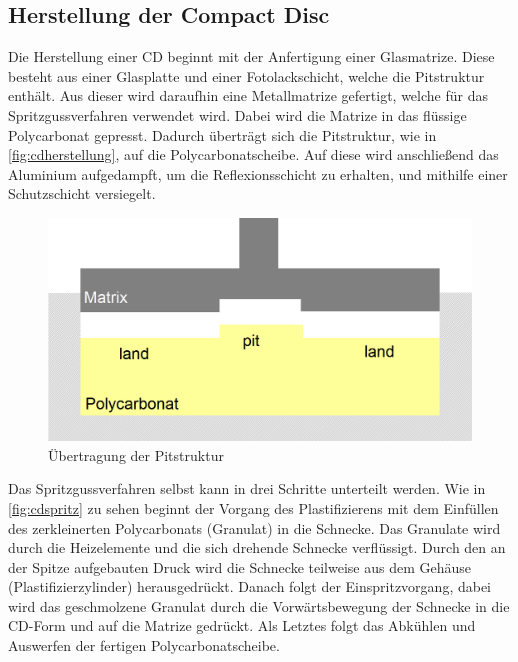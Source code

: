 \subsection{Herstellung der Compact Disc}
\label{subsec:cdherstellung}

Die Herstellung einer CD beginnt mit der Anfertigung einer Glasmatrize. Diese
besteht aus einer Glasplatte und einer Fotolackschicht, welche die Pitstruktur
enthält. Aus dieser wird daraufhin eine Metallmatrize gefertigt, welche für das
Spritzgussverfahren verwendet wird. Dabei wird die Matrize in das flüssige
Polycarbonat gepresst. Dadurch überträgt sich die Pitstruktur, wie in
\autoref{fig:cdherstellung}, auf die Polycarbonatscheibe. Auf diese wird
anschließend das Aluminium aufgedampft, um die Reflexionsschicht zu erhalten,
und mithilfe einer Schutzschicht versiegelt. \cite{cdp}

\begin{figure}[h]
    \begin{center}
        \begin{minipage}[t]{\textwidth}
            \begin{center}
                \includegraphics[height=0.1\textheight]{Bilder/Optische_Datentraeger_Die_Compact_Disc/Herstellung/cdherstellung.png}
                \caption[Übertragung der Pitstruktur \newline \url{http://daten.didaktikchemie.uni-bayreuth.de/umat/cd_dvd/spritzguss.gif} (zuletzt aufgerufen am 07.08.2015)]{Übertragung der Pitstruktur}
                \label{fig:cdherstellung}
            \end{center}
        \end{minipage}
    \end{center}
\end{figure}

Das Spritzgussverfahren selbst kann in drei Schritte unterteilt werden. Wie in
\autoref{fig:cdspritz} zu sehen beginnt der Vorgang des Plastifizierens mit dem
Einfüllen des zerkleinerten Polycarbonats (Granulat) in die Schnecke. Das
Granulate wird durch die Heizelemente und die sich drehende Schnecke
verflüssigt. Durch den an der Spitze aufgebauten Druck wird die Schnecke
teilweise aus dem Gehäuse (Plastifizierzylinder) herausgedrückt. Danach folgt
der Einspritzvorgang, dabei wird das geschmolzene Granulat durch die
Vorwärtsbewegung der Schnecke in die CD-Form und auf die Matrize gedrückt. Als
Letztes folgt das Abkühlen und Auswerfen der fertigen Polycarbonatscheibe.
\cite{cdpf}

